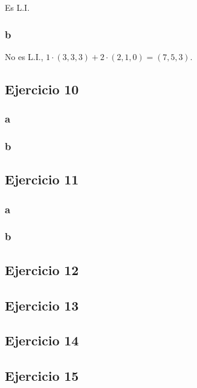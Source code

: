 \documentclass{article}
\begin{document}
Es L.I.

\subsubsection*{b}

No es L.I., $1\cdot(3,3,3) + 2\cdot(2,1,0) = (7,5,3)$.

\subsection*{Ejercicio 10}

\subsubsection*{a}

\subsubsection*{b}

\subsection*{Ejercicio 11}

\subsubsection*{a}

\subsubsection*{b}

\subsection*{Ejercicio 12}

\subsection*{Ejercicio 13}

\subsection*{Ejercicio 14}

\subsection*{Ejercicio 15}
\end{document}
